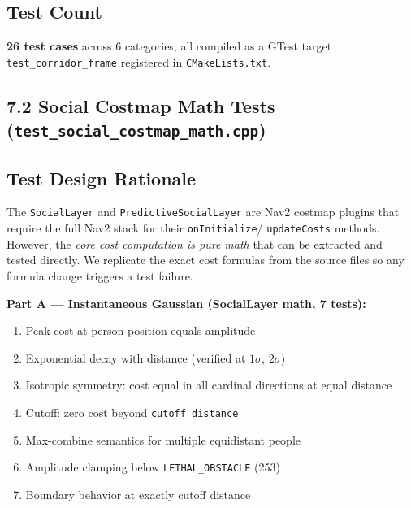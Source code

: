 \documentclass[11pt]{article}
\newcommand{\logentry}[1]{\subsection*{#1}}
\begin{document}
\logentry{Test Count}
\textbf{26 test cases} across 6 categories, all compiled as a GTest target
\texttt{test\_corridor\_frame} registered in \texttt{CMakeLists.txt}.


\subsection*{7.2 Social Costmap Math Tests (\texttt{test\_social\_costmap\_math.cpp})}

\logentry{Test Design Rationale}
The \texttt{SocialLayer} and \texttt{PredictiveSocialLayer} are Nav2 costmap
plugins that require the full Nav2 stack for their \texttt{onInitialize}/
\texttt{updateCosts} methods. However, the \emph{core cost computation is pure
math} that can be extracted and tested directly. We replicate the exact cost
formulas from the source files so any formula change triggers a test failure.

\textbf{Part A --- Instantaneous Gaussian (SocialLayer math, 7 tests):}
\begin{enumerate}
  \item Peak cost at person position equals amplitude
  \item Exponential decay with distance (verified at $1\sigma$, $2\sigma$)
  \item Isotropic symmetry: cost equal in all cardinal directions at equal distance
  \item Cutoff: zero cost beyond \texttt{cutoff\_distance}
  \item Max-combine semantics for multiple equidistant people
  \item Amplitude clamping below \texttt{LETHAL\_OBSTACLE} (253)
  \item Boundary behavior at exactly cutoff distance
\end{enumerate}
\end{document}
